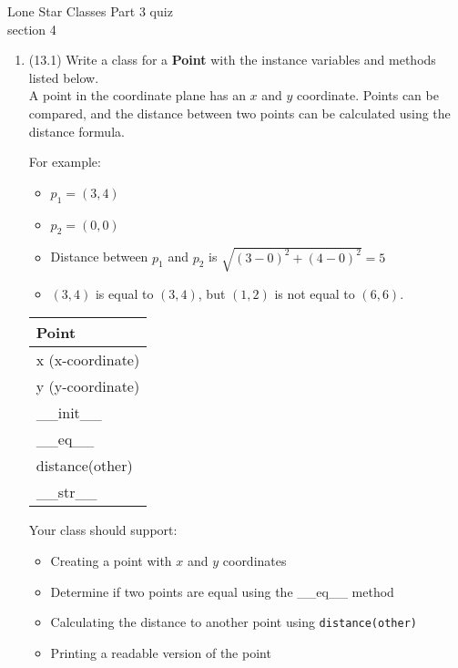 \documentclass{article}
\begin{document}

Lone Star \hfill Classes Part 3 quiz\\
section 4\\
\begin{enumerate}
\item (13.1)
		Write a class for a \textbf{Point} with the instance variables and methods listed below.\\
		A point in the coordinate plane has an $x$ and $y$ coordinate. Points can be compared, 
		and the distance between two points can be calculated using the distance formula.
			
		\begin{minipage}[t]{0.65\textwidth}
			For example:
			\begin{itemize}
				\item $p_1 = (3, 4)$
				\item $p_2 = (0, 0)$
				\item Distance between $p_1$ and $p_2$ is $\sqrt{(3 - 0)^2 + (4 - 0)^2} = 5$
				\item $(3,4)$ is equal to $(3,4)$, but $(1,2)$ is not equal to $(6,6)$.
			\end{itemize}
		\end{minipage}
		\hfill
		\begin{minipage}[t]{0.32\textwidth}
			\vspace{.2em}
			\begin{flushright}
				\begin{tabular}{|l|}
					\hline
					Point \\ \hline
					x (x-coordinate) \\
					y (y-coordinate) \\ \hline
					\_\_init\_\_ \\
					\_\_eq\_\_ \\
					distance(other) \\
					\_\_str\_\_ \\ \hline
				\end{tabular}
			\end{flushright}
		\end{minipage}
		
		Your class should support:
		\begin{itemize}
			\item Creating a point with $x$ and $y$ coordinates
			\item Determine if two points are equal using the \_\_eq\_\_  method	
			\item Calculating the distance to another point using \texttt{distance(other)}
			\item Printing a readable version of the point
		\end{itemize}
		

\end{enumerate}
\end{document}
